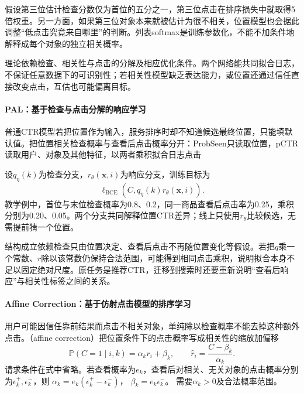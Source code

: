 假设第三位估计检查分数仅为首位的五分之一，第三位点击在排序损失中就取得5倍权重。另一方面，如果第三位对象本来就被估计为很不相关，位置模型也会据此调整“低点击究竟来自哪里”的判断。列表softmax是训练参数化，不能不加条件地解释成每个对象的独立相关概率。

理论依赖检查、相关性与点击的分解及相应优化条件。两个网络能共同拟合日志，不保证任意数据下的可识别性；若相关性模型缺乏表达能力，或位置还通过信任直接改变点击，互估也可能偏离目标。

\paragraph{PAL：基于检查与点击分解的响应学习}
\label{sec:rs-pal}

普通CTR模型若把位置作为输入，服务排序时却不知道候选最终位置，只能填默认值。把位置相关检查概率与查看后点击概率分开：ProbSeen只读取位置，pCTR读取用户、对象及其他特征，以两者乘积拟合日志点击

设$q_\eta(k)$为检查分支，$r_\theta(\bm x,i)$为响应分支，训练目标为
\[
 \ell_{\mathrm{BCE}}\!\left(C,q_\eta(k)r_\theta(\bm x,i)\right).
\]
教学例中，首位与末位检查概率为0.8、0.2，同一商品查看后点击率为0.25，乘积分别为0.20、0.05。两个分支共同解释位置CTR差异；线上只使用$r_\theta$比较候选，无需提前猜一个位置。

结构成立依赖检查只由位置决定、查看后点击不再随位置变化等假设。若把$q$乘一个常数、$r$除以该常数仍保持合法范围，可能得到相同点击乘积，说明拟合本身不足以固定绝对尺度。原任务是推荐CTR，迁移到搜索时还要重新说明“查看后响应”与相关性标签之间的关系。

\paragraph{Affine Correction：基于仿射点击模型的排序学习}
\label{sec:rs-affine-correction}

用户可能因信任靠前结果而点击不相关对象，单纯除以检查概率不能去掉这种额外点击。（affine correction）把位置条件下的点击概率写成相关性的缩放加偏移
\begin{equation}
 \mathbb P(C=1\mid i,k)=\alpha_k r_i+\beta_k,\qquad
 \widehat r_i=\frac{C-\beta_k}{\alpha_k}.
 \label{eq:rs-affine}
\end{equation}
请求条件在式中省略。若查看概率为$e_k$，查看后对相关、无关对象的点击概率分别为$\epsilon_k^+,\epsilon_k^-$，则
$\alpha_k=e_k(\epsilon_k^+-\epsilon_k^-)$，
$\beta_k=e_k\epsilon_k^-$。
需要$\alpha_k>0$及合法概率范围。

